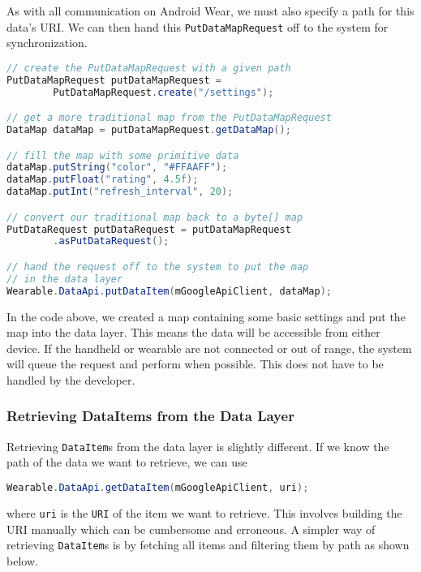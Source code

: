 As with all communication on Android Wear, we must also specify a path for this
data's URI. We can then hand this \texttt{PutDataMapRequest} off to the system
for synchronization.

\begin{lstlisting}[language=Java]
// create the PutDataMapRequest with a given path
PutDataMapRequest putDataMapRequest =
        PutDataMapRequest.create("/settings");

// get a more traditional map from the PutDataMapRequest
DataMap dataMap = putDataMapRequest.getDataMap();

// fill the map with some primitive data
dataMap.putString("color", "#FFAAFF");
dataMap.putFloat("rating", 4.5f);
dataMap.putInt("refresh_interval", 20);

// convert our traditional map back to a byte[] map
PutDataRequest putDataRequest = putDataMapRequest
        .asPutDataRequest();

// hand the request off to the system to put the map
// in the data layer
Wearable.DataApi.putDataItem(mGoogleApiClient, dataMap);
\end{lstlisting}

In the code above, we created a map containing some basic settings and put the
map into the data layer. This means the data will be accessible from either
device. If the handheld or wearable are not connected or out of range, the
system will queue the request and perform when possible. This does not have to
be handled by the developer.

\subsubsection{Retrieving DataItems from the Data Layer}
Retrieving \texttt{DataItem}s from the data layer is slightly different. If we
know the path of the data we want to retrieve, we can use

\begin{lstlisting}[language=Java]
Wearable.DataApi.getDataItem(mGoogleApiClient, uri);
\end{lstlisting}

where \texttt{uri} is the \texttt{URI} of the item we want to retrieve. This
involves building the URI manually which can be cumbersome and erroneous. A
simpler way of retrieving \texttt{DataItem}s is by fetching all items and
filtering them by path as shown below.

